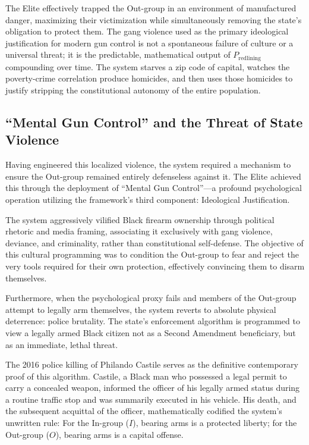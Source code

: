 \documentclass[12pt,openany]{book}
\begin{document}
The Elite effectively trapped the Out-group in an environment of manufactured danger, maximizing their victimization while simultaneously removing the state's obligation to protect them. The gang violence used as the primary ideological justification for modern gun control is not a spontaneous failure of culture or a universal threat; it is the predictable, mathematical output of $P_{\text{redlining}}$ compounding over time. The system starves a zip code of capital, watches the poverty-crime correlation produce homicides, and then uses those homicides to justify stripping the constitutional autonomy of the entire population.

\subsection{``Mental Gun Control'' and the Threat of State Violence}
Having engineered this localized violence, the system required a mechanism to ensure the Out-group remained entirely defenseless against it. The Elite achieved this through the deployment of ``Mental Gun Control''---a profound psychological operation utilizing the framework's third component: Ideological Justification.

The system aggressively vilified Black firearm ownership through political rhetoric and media framing, associating it exclusively with gang violence, deviance, and criminality, rather than constitutional self-defense. The objective of this cultural programming was to condition the Out-group to fear and reject the very tools required for their own protection, effectively convincing them to disarm themselves.

Furthermore, when the psychological proxy fails and members of the Out-group attempt to legally arm themselves, the system reverts to absolute physical deterrence: police brutality. The state's enforcement algorithm is programmed to view a legally armed Black citizen not as a Second Amendment beneficiary, but as an immediate, lethal threat.

The 2016 police killing of Philando Castile serves as the definitive contemporary proof of this algorithm. Castile, a Black man who possessed a legal permit to carry a concealed weapon, informed the officer of his legally armed status during a routine traffic stop and was summarily executed in his vehicle. His death, and the subsequent acquittal of the officer, mathematically codified the system's unwritten rule: For the In-group ($I$), bearing arms is a protected liberty; for the Out-group ($O$), bearing arms is a capital offense.
\end{document}

